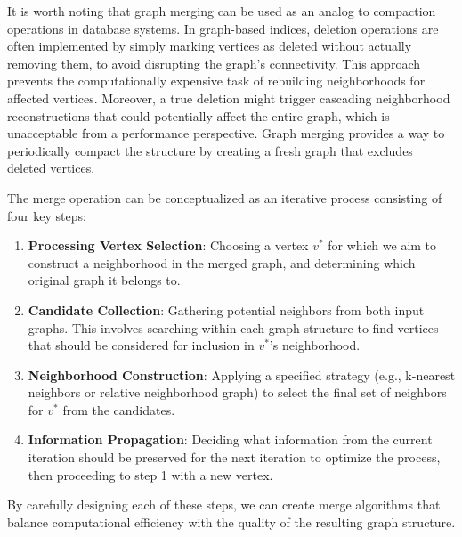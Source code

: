 \documentclass{article}
\begin{document}
It is worth noting that graph merging can be used as an analog to compaction operations in database systems. In graph-based indices, deletion operations are often implemented by simply marking vertices as deleted without actually removing them, to avoid disrupting the graph's connectivity. This approach prevents the computationally expensive task of rebuilding neighborhoods for affected vertices. Moreover, a true deletion might trigger cascading neighborhood reconstructions that could potentially affect the entire graph, which is unacceptable from a performance perspective. Graph merging provides a way to periodically compact the structure by creating a fresh graph that excludes deleted vertices.

The merge operation can be conceptualized as an iterative process consisting of four key steps:

\begin{enumerate}
    \item \textbf{Processing Vertex Selection}: Choosing a vertex $v^*$ for which we aim to construct a neighborhood in the merged graph, and determining which original graph it belongs to.
   
    \item \textbf{Candidate Collection}: Gathering potential neighbors from both input graphs. This involves searching within each graph structure to find vertices that should be considered for inclusion in $v^*$'s neighborhood.
   
    \item \textbf{Neighborhood Construction}: Applying a specified strategy (e.g., k-nearest neighbors or relative neighborhood graph) to select the final set of neighbors for $v^*$ from the candidates.
   
    \item \textbf{Information Propagation}: Deciding what information from the current iteration should be preserved for the next iteration to optimize the process, then proceeding to step 1 with a new vertex.
\end{enumerate}

By carefully designing each of these steps, we can create merge algorithms that balance computational efficiency with the quality of the resulting graph structure. 
\end{document}
